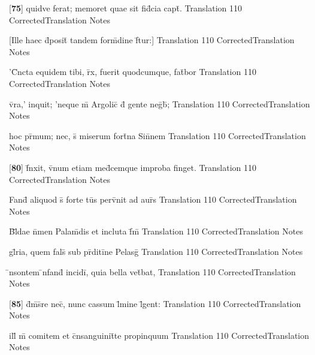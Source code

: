 \latline
  {[\textbf{75}] quidve ferat; memoret quae sit fid\={}cia capt\={}.}
  { Translation }
  {110}
  { CorrectedTranslation }
  { Notes }


\latline
  {[Ille haec d\={}posit\={} tandem form\={\macron {\i}}dine f\={}tur:] }
  { Translation }
  {110}
  { CorrectedTranslation }
  { Notes }


\latline
  {'C\={}ncta equidem tibi, r\={}x, fuerit quodcumque, fat\={}bor}
  { Translation }
  {110}
  { CorrectedTranslation }
  { Notes }


\latline
  {v\={}ra,' inquit; 'neque m\={} Argolic\={} d\={} gente neg\={}b\={};}
  { Translation }
  {110}
  { CorrectedTranslation }
  { Notes }


\latline
  {hoc pr\={\macron {\i}}mum; nec, s\={\macron {\i}} miserum fort\={}na Sin\={}nem}
  { Translation }
  {110}
  { CorrectedTranslation }
  { Notes }


\latline
  {[\textbf{80}] f\={\macron {\i}}nxit, v\={}num etiam med\={}cemque improba finget.}
  { Translation }
  {110}
  { CorrectedTranslation }
  { Notes }


\latline
  {Fand\={} aliquod s\={\macron {\i}} forte tu\={}s perv\={}nit ad aur\={\macron {\i}}s}
  { Translation }
  {110}
  { CorrectedTranslation }
  { Notes }


\latline
  {B\={}l\={\macron {\i}}dae n\={}men Palam\={}dis et incluta f\={}m\={}}
  { Translation }
  {110}
  { CorrectedTranslation }
  { Notes }


\latline
  {gl\={}ria, quem fals\={} sub pr\={}diti\={}ne Pelasg\={\macron {\i}}}
  { Translation }
  {110}
  { CorrectedTranslation }
  { Notes }


\latline
  {\={\macron {\i}}nsontem \={\macron {\i}}nfand\={} incidi\={}, quia bella vet\={}bat,}
  { Translation }
  {110}
  { CorrectedTranslation }
  { Notes }


\latline
  {[\textbf{85}] d\={}m\={\macron {\i}}s\={}re nec\={\macron {\i}}, nunc cassum l\={}mine l\={}gent:}
  { Translation }
  {110}
  { CorrectedTranslation }
  { Notes }


\latline
  {ill\={\macron {\i}} m\={} comitem et c\={}nsanguinit\={}te propinquum}
  { Translation }
  {110}
  { CorrectedTranslation }
  { Notes }


